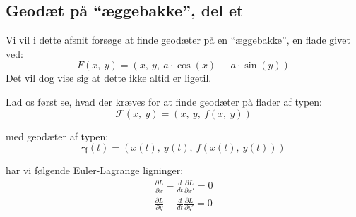 ﻿\newcommand\diff[1]{{#1}'}
\newcommand\ddiff[1]{{#1}''}

\subsection{ Geodæt på ``æggebakke'', del et }
Vi vil i dette afsnit forsøge at finde geodæter på en ``æggebakke'',
en flade givet ved:
\begin{equation}\label{eq:aeggebakke}
F(x,~y) = (x,~y,~a \cdot \cos(x)+~a \cdot \sin(y))
\end{equation}
Det vil dog vise sig at dette ikke altid er ligetil.

Lad os først se, hvad der kræves for at finde geodæter på flader af typen:
\begin{equation*}
\mathscr{F}(x,~y) = (x,~y,~f(x,~y))
\end{equation*}

med geodæter af typen:
\begin{equation*}
\pmb{\gamma}(t) = (x(t),~y(t),~f(x(t),~y(t)))
\end{equation*}

har vi følgende Euler-Lagrange ligninger:
\begin{equation*}
\begin{gathered}
\frac{\partial L}{\partial x} - \frac{d}{dt}\frac{\partial L}{\partial \diff{x}} = 0\\
\frac{\partial L}{\partial y} - \frac{d}{dt}\frac{\partial L}{\partial \diff{y}} = 0
\end{gathered}
\end{equation*}

